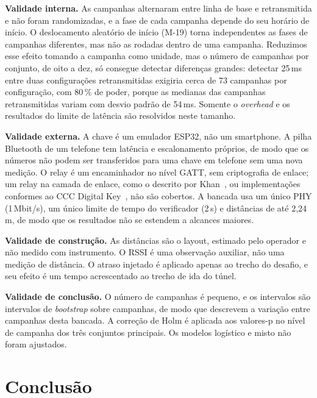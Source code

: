 \documentclass{ieeeaccess}
\begin{document}
\textbf{Validade interna.} As campanhas alternaram entre linha de base e retransmitida e não foram randomizadas, e a fase de cada campanha depende do seu horário de início. O deslocamento aleatório de início (M-19) torna independentes as fases de campanhas diferentes, mas não as rodadas dentro de uma campanha. Reduzimos esse efeito tomando a campanha como unidade, mas o número de campanhas por conjunto, de oito a dez, só consegue detectar diferenças grandes: detectar 25\,ms entre duas configurações retransmitidas exigiria cerca de 73 campanhas por configuração, com 80\,\% de poder, porque as medianas das campanhas retransmitidas variam com desvio padrão de 54\,ms. Somente o \emph{overhead} e os resultados do limite de latência são resolvidos neste tamanho.

\textbf{Validade externa.} A chave é um emulador ESP32, não um smartphone. A pilha Bluetooth de um telefone tem latência e escalonamento próprios, de modo que os números não podem ser transferidos para uma chave em telefone sem uma nova medição. O relay é um encaminhador no nível GATT, sem criptografia de enlace; um relay na camada de enlace, como o descrito por Khan~\cite{b4}, ou implementações conformes ao CCC Digital Key~\cite{b9}, não são cobertos. A bancada usa um único PHY (1\,Mbit/s), um único limite de tempo do verificador (2\,s) e distâncias de até 2,24\,m, de modo que os resultados não se estendem a alcances maiores.

\textbf{Validade de construção.} As distâncias são o layout, estimado pelo operador e não medido com instrumento. O RSSI é uma observação auxiliar, não uma medição de distância. O atraso injetado é aplicado apenas ao trecho do desafio, e seu efeito é um tempo acrescentado ao trecho de ida do túnel.

\textbf{Validade de conclusão.} O número de campanhas é pequeno, e os intervalos são intervalos de \emph{bootstrap} sobre campanhas, de modo que descrevem a variação entre campanhas desta bancada. A correção de Holm é aplicada aos valores-p no nível de campanha dos três conjuntos principais. Os modelos logístico e misto não foram ajustados.

\section{Conclusão}
\label{sec:conclusion}
\end{document}
